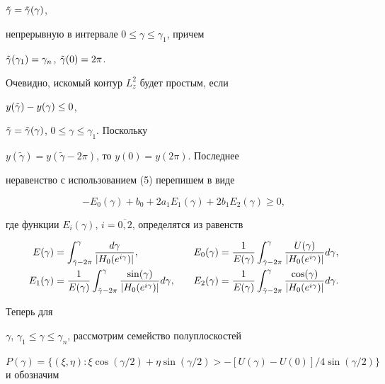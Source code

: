 $\Tilde\gamma=\Tilde\gamma(\gamma)$,


непрерывную в интервале $0\le\gamma\le\gamma_1$, причем


$\Tilde\gamma(\gamma_1)=\gamma_n$, $\Tilde\gamma(0)=2\pi$.


Очевидно, искомый контур $L_z^2$ будет простым, если


$y(\Tilde\gamma)-y(\gamma)\le 0$,


$\Tilde\gamma=\Tilde\gamma(\gamma)$, $0\le\gamma\le\gamma_1$. Поскольку


$y(\tilde\gamma)=y(\tilde\gamma-2\pi)$, то $y(0)=y(2\pi)$. Последнее


неравенство с использованием (5) перепишем в виде


\begin{equation}


-E_0(\gamma)+b_0+2a_1E_1(\gamma)+2b_1E_2(\gamma)\ge 0,


\end{equation}


где функции $E_i(\gamma)$, $i=\overline{0,2}$, определятся из равенств


\begin{alignat*}{2}


E(\gamma)&=\int_{\Tilde\gamma-2\pi}^{\gamma}


\frac{d\gamma}{|H_0(e^{i\gamma})|}, &\quad


E_0(\gamma)&=


\frac{1}{E(\gamma)}\int_{\Tilde\gamma-


2\pi}^{\gamma}\frac{U(\gamma)}{|H_0(e^{i\gamma})|}d{\gamma}, \\


E_1(\gamma)&=


\frac{1}{E(\gamma)}\int_{\Tilde\gamma-


2\pi}^{\gamma}\frac{\sin(\gamma)}{|H_0(e^{i\gamma})|}d{\gamma}, &\quad


E_2(\gamma)&=\frac{1}{E(\gamma)}\int_{\tilde\gamma-


2\pi}^{\gamma}\frac{\cos(\gamma)}{|H_0(e^{i\gamma})|}d{\gamma}.


\end{alignat*}


Теперь для


$\gamma$, $\gamma_1\le\gamma\le\gamma_n$, рассмотрим семейство полуплоскостей


$P(\gamma)=\{(\xi,\eta):\xi \cos(\gamma/2)+\eta \sin(\gamma/2)> -[U(\gamma)-


U(0)]/4\sin(\gamma/2)\}$ и обозначим


